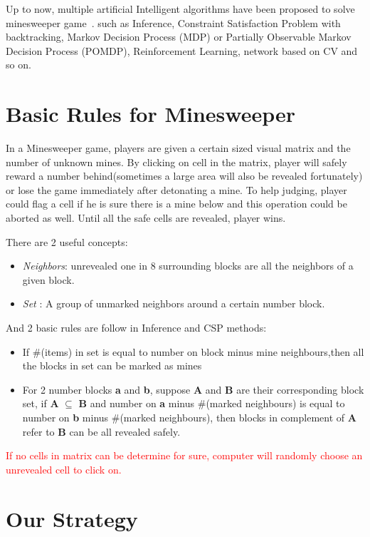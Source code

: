 \documentclass[10pt,twocolumn,letterpaper]{article}
\begin{document}
Up to now, multiple artificial Intelligent algorithms have been proposed to solve minesweeper game~\cite{Analysis}. such as Inference, Constraint Satisfaction Problem with backtracking, Markov Decision Process (MDP) or Partially Observable Markov Decision Process (POMDP), Reinforcement Learning, network based on CV and so on. 


\section{Basic Rules for Minesweeper}
In a Minesweeper game, players are given a certain sized visual matrix and the number of unknown mines. By clicking on cell in the matrix, player will safely reward a number behind(sometimes a large area will also be revealed fortunately) or lose the game immediately after detonating a mine. To help judging, player could flag a cell if he is sure there is a mine below and this operation could be aborted as well. Until all the safe cells are revealed, player wins. 

There are 2 useful concepts: 
	\begin{itemize}
		\item \textit{Neighbors}: unrevealed one in 8 surrounding blocks are all the neighbors of a given block.
		\item \textit{Set} : A group of unmarked neighbors around a certain number block.
	\end{itemize}

And 2 basic rules are follow in Inference and CSP methods:
	\begin{itemize}
		\item If \#(items) in set is equal to number on block minus mine neighbours,then all the blocks in set can be marked as mines
		\item For 2 number blocks \textbf{a} and \textbf{b}, suppose \textbf{A} and \textbf{B} are their corresponding block set, if \textbf{A} $\subseteq$ \textbf{B} and number on \textbf{a} minus \#(marked neighbours) is equal to number on \textbf{b} minus \#(marked neighbours), then blocks in complement of \textbf{A} refer to \textbf{B} can be all revealed safely.
	\end{itemize}
	
\textcolor{red}
{If no cells in matrix can be determine for sure, computer will randomly choose an unrevealed cell to click on.} 

\section{Our Strategy}
\end{document}
